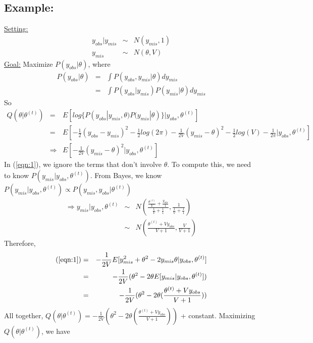 \documentclass[12pt,a4paper]{article}
\begin{document}
\subsection{Example:}
\underline{Setting:} 
\begin{eqnarray}
y_{obs} | y_{mis} &\sim& N(y_{mis},1) \nonumber \\
y_{mis} &\sim& N(\theta, V) \nonumber
\end{eqnarray}
\underline{Goal:} Maximize $P(y_{obs}|\theta)$, where
\begin{eqnarray}
P(y_{obs}|\theta) &=& \int P(y_{obs},y_{mis}|\theta) dy_{mis} \nonumber \\
&=& \int P(y_{obs}|y_{mis})P(y_{mis}|\theta)dy_{mis} \nonumber
\end{eqnarray}
So
\begin{eqnarray}\label{eqn:1}
Q(\theta|\theta^{(t)}) &=& E[log\{P(y_{obs}|y_{mis},\theta)P(y_{mis}|\theta)\}|y_{obs},\theta^{(t)}] \nonumber \\
&=& E[-\frac{1}{2}(y_{obs}-y_{mis})^2-\frac{1}{2}log(2\pi)-\frac{1}{2V}(y_{mis} - \theta)^2 - \frac{1}{2}log(V) - \frac{1}{2\pi} | y_{obs},\theta^{(t)}] \nonumber \\
&\Rightarrow& E[-\frac{1}{2V}(y_{mis} - \theta)^2 | y_{obs},\theta^{(t)}]
\end{eqnarray}
In (\ref{eqn:1}), we ignore the terms that don't involve $\theta$. To compute this, we need to know $P(y_{mis}|y_{obs},\theta^{(t)})$. From Bayes, we know $P(y_{mis}|y_{obs},\theta^{(t)}) \propto P(y_{mis},y_{obs}|\theta^{(t)})$
\begin{eqnarray}
\Rightarrow y_{mis}|y_{obs}, \theta^{(t)} &\sim& N(\frac{\frac{\theta^{(t)}}{V}+\frac{y_{obs}}{1}}{\frac{1}{V}+\frac{1}{1}},\frac{1}{\frac{1}{V}+\frac{1}{1}}) \nonumber \\
&\sim & N(\frac{\theta^{(t)} + Vy_{obs}}{V+1},\frac{V}{V+1}) \nonumber
\end{eqnarray}
Therefore, 
\begin{eqnarray}
(\ref{eqn:1}) &=& -\frac{1}{2V}E[y_{mis}^2+\theta^2 -2y_{mis}\theta|y_{obs},\theta^{(t)}] \nonumber \\
&=& -\frac{1}{2V}(\theta^2 - 2\theta E[y_{mis}|y_{obs},\theta^{(t)}]) \nonumber \\
&=& -\frac{1}{2V}(\theta^2 - 2\theta(\frac{\theta^{(t)}+Vy_{obs}}{V+1})) \nonumber
\end{eqnarray}
All together, $Q(\theta|\theta^{(t)}) = -\frac{1}{2V}(\theta^2 - 2\theta(\frac{\theta^{(t)}+Vy_{obs}}{V+1}))$ + constant. Maximizing $Q(\theta|\theta^{(t)})$, we have 
\end{document}
